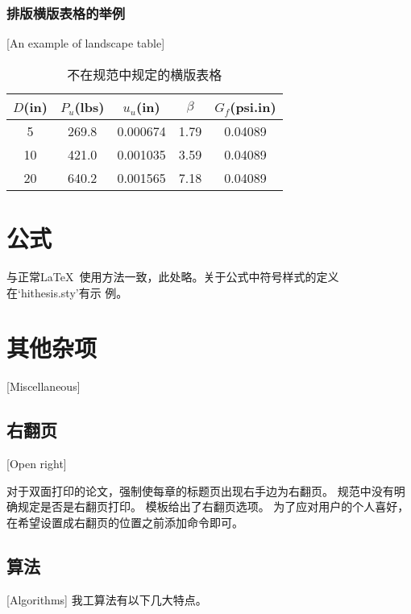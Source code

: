 \subsubsection{排版横版表格的举例}[An example of landscape table]

\begin{table}[p]
	\centering
	\begin{sideways}
		\begin{minipage}{\textheight}
			\caption{不在规范中规定的横版表格}
			\vspace{0.5em}\centering\wuhao
			\begin{tabular}{ccccc}
				\toprule[1.5pt]
				$D$(in) & $P_u$(lbs) & $u_u$(in) & $\beta$ & $G_f$(psi.in) \\
				\midrule[1pt]
				5       & 269.8      & 0.000674  & 1.79    & 0.04089       \\
				10      & 421.0      & 0.001035  & 3.59    & 0.04089       \\
				20      & 640.2      & 0.001565  & 7.18    & 0.04089       \\
				\bottomrule[1.5pt]
			\end{tabular}
		\end{minipage}
	\end{sideways}
\end{table}


\section{公式}
与正常\LaTeX\ 使用方法一致，此处略。关于公式中符号样式的定义在`hithesis.sty'有示
例。

\section{其他杂项}[Miscellaneous]

\subsection{右翻页}[Open right]

对于双面打印的论文，强制使每章的标题页出现右手边为右翻页。
规范中没有明确规定是否是右翻页打印。
模板给出了右翻页选项。
为了应对用户的个人喜好，在希望设置成右翻页的位置之前添加命令即可。

\subsection{算法}[Algorithms]
我工算法有以下几大特点。

